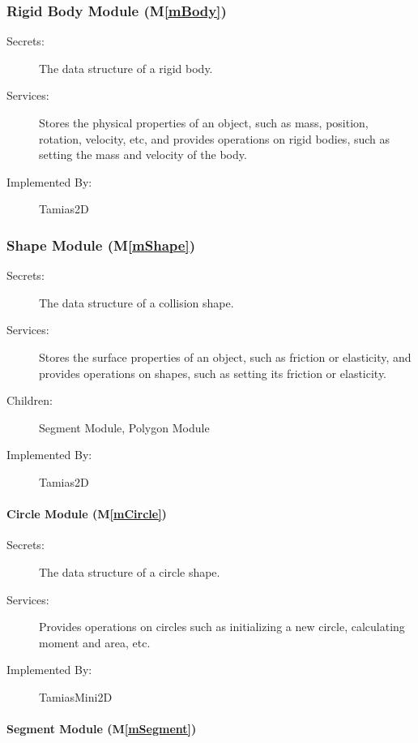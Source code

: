 \documentclass[12pt]{article}
\newcommand{\mref}[1]{M\ref{#1}}
\newcommand{\progname}{Tamias2D}
\begin{document}
\subsubsection{Rigid Body Module (\mref{mBody})}

\begin{description}
\item[Secrets:]The data structure of a rigid body.
\item[Services:]Stores the physical properties of an object, such as mass, 
position, rotation, velocity, etc, and provides operations on rigid bodies, such as setting the mass and velocity of the body.

\item[Implemented By:] {\progname}
\end{description}

\subsubsection{Shape Module (\mref{mShape})}

\begin{description}
\item[Secrets:]The data structure of a collision shape.
\item[Services:]Stores the surface properties of an object, such as friction or elasticity, and provides operations on shapes, such as setting its friction or elasticity.
\item[Children:] Segment Module, Polygon Module
\item[Implemented By:] {\progname}
\end{description}

\paragraph{Circle Module (\mref{mCircle})}

\begin{description}
	\item[Secrets:] The data structure of a circle shape.
	\item[Services:] Provides operations on circles such as initializing a new circle, calculating moment and area, etc.
	\item[Implemented By:] TamiasMini2D
\end{description}

\paragraph{Segment Module (\mref{mSegment})}
\end{document}
